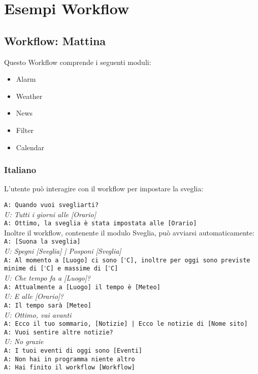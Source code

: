 \section{Esempi Workflow}
\subsection{Workflow: Mattina}
Questo Workflow comprende i seguenti moduli:
\begin{itemize}
	\item Alarm
	\item Weather
	\item News
	\item Filter
	\item Calendar
\end{itemize}

\subsubsection{Italiano}
L'utente può interagire con il workflow per impostare la sveglia:\\
\newline

\texttt{A: Quando vuoi svegliarti?}\\
\textit{U: Tutti i giorni alle [Orario]}\\
\texttt{A: Ottimo, la sveglia è stata impostata alle [Orario]} \\

Inoltre il workflow, contenente il modulo Sveglia, può avviarsi automaticamente:\\
\newline
\texttt{A: [Suona la sveglia]}\\
\textit{U: Spegni [Sveglia] | Posponi [Sveglia]}\\
\texttt{A: Al momento a [Luogo] ci sono [$^\circ$C], inoltre per oggi sono previste minime di [$^\circ$C] e massime di [$^\circ$C]}\\
\textit{U: Che tempo fa a [Luogo]?}\\
\texttt{A: Attualmente a [Luogo] il tempo è [Meteo]}\\
\textit{U: E alle [Orario]?}\\
\texttt{A: Il tempo sarà [Meteo]}\\
\textit{U: Ottimo, vai avanti}\\
\texttt{A: Ecco il tuo sommario, [Notizie] | Ecco le notizie di [Nome sito]}\\
\texttt{A: Vuoi sentire altre notizie?}\\ 
\textit{U: No grazie}\\
\texttt{A: I tuoi eventi di oggi sono [Eventi]}\\
\texttt{A: Non hai in programma niente altro}\\
\texttt{A: Hai finito il workflow [Workflow]}

